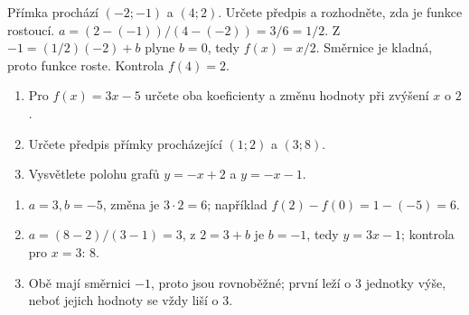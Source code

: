 \documentclass[11pt,a4paper]{article}
\begin{document}
\begin{zadaniReseniBox}
Přímka prochází $(-2;-1)$ a $(4;2)$. Určete předpis a rozhodněte, zda je funkce rostoucí.
\tcblower
$a=(2-(-1))/(4-(-2))=3/6=1/2$. Z $-1=(1/2)(-2)+b$ plyne $b=0$, tedy $f(x)=x/2$. Směrnice je kladná, proto funkce roste. Kontrola $f(4)=2$.
\end{zadaniReseniBox}
\begin{zadaniReseniBox}
\begin{enumerate}[label=\alph*)]
\item Pro $f(x)=3x-5$ určete oba koeficienty a změnu hodnoty při zvýšení $x$ o $2$.
\item Určete předpis přímky procházející $(1;2)$ a $(3;8)$.
\item Vysvětlete polohu grafů $y=-x+2$ a $y=-x-1$.
\end{enumerate}
\tcblower
\begin{enumerate}[label=\alph*)]
\item $a=3,b=-5$, změna je $3\cdot2=6$; například $f(2)-f(0)=1-(-5)=6$.
\item $a=(8-2)/(3-1)=3$, z $2=3+b$ je $b=-1$, tedy $y=3x-1$; kontrola pro $x=3$: $8$.
\item Obě mají směrnici $-1$, proto jsou rovnoběžné; první leží o $3$ jednotky výše, neboť jejich hodnoty se vždy liší o $3$.
\end{enumerate}
\end{zadaniReseniBox}
\end{document}
